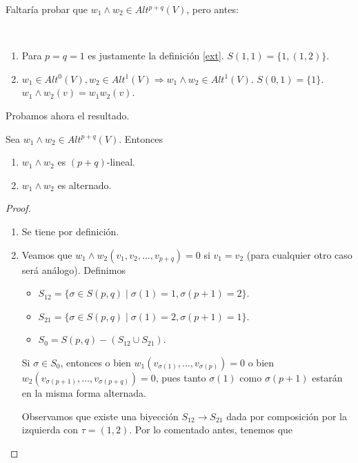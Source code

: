 \documentclass[cursovd_portada.tex]{subfiles}
\begin{document}
Faltaría probar que $w_1\land w_2\in Alt^{p+q}(V)$, pero antes:
\begin{nota}\
\begin{enumerate}
\item Para $p=q=1$ es justamente la definición \ref{ext}. $S(1,1)=\{1,(1,2)\}$.
\item $w_1\in Alt^0(V), w_2\in Alt^1(V)\Rightarrow w_1\land w_2\in Alt^1(V)$. $S(0,1)=\{1\}$. $w_1\land w_2(v)=w_1 w_2(v)$.
\end{enumerate}
Probamos ahora el resultado. 

\begin{lemma}
Sea $w_1\land w_2\in Alt^{p+q}(V)$. Entonces
\begin{enumerate}
\item $w_1\land w_2$ es $(p+q)$-lineal.
\item $w_1\land w_2$ es alternado.
\end{enumerate}
\end{lemma}
\begin{proof}\
\begin{enumerate}
\item Se tiene por definición.
\item Veamos que $w_1\land w_2(v_1,v_2,\dots, v_{p+q})=0$ si $v_1=v_2$ (para cualquier otro caso será análogo). Definimos
\begin{itemize}
\item $S_{12}=\{\sigma\in S(p,q)\mid \sigma(1)=1,\sigma(p+1)=2\}$.
\item $S_{21}=\{\sigma\in S(p,q)\mid \sigma(1)=2,\sigma(p+1)=1\}$.
\item $S_0=S(p,q)-(S_{12}\cup S_{21})$.
\end{itemize}
Si $\sigma\in S_0$, entonces o bien $w_1(v_{\sigma(1)},\dots, v_{\sigma(p)})=0$ o bien $w_2(v_{\sigma(p+1)},\dots, v_{\sigma(p+q)})=0$, pues tanto $\sigma(1)$ como $\sigma(p+1)$ estarán en la misma forma alternada.

Observamos que existe una biyección $S_{12}\to S_{21}$ dada por composición por la izquierda con $\tau=(1,2)$. Por lo comentado antes, tenemos que


\end{enumerate}
\end{proof}
\end{nota}
\end{document}
